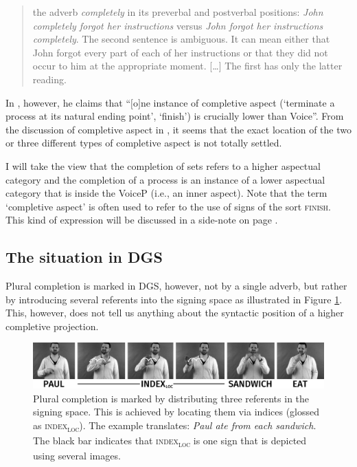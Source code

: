 \begin{quote}
the adverb \textit{completely} in its preverbal and postverbal positions: \textit{John completely forgot her instructions} versus \textit{John forgot her instructions completely}. The second sentence is ambiguous. It can mean either that John forgot every part of each of her instructions or that they did not occur to him at the appropriate moment. [\dots ] The first has only the latter reading.
\end{quote}


\noindent In \citet[69]{cinque2006restructuring}, however, he claims that ``$[$o$]$ne instance of completive aspect (`terminate a process at its natural ending point', `finish') is crucially lower than Voice''. From the discussion of completive aspect in \citet{cinque2006restructuring}, it seems that the exact location of the two or three different types of completive aspect is not totally settled. 

I will take the view that the completion of sets refers to a higher aspectual category and the completion of a process is an instance of a lower aspectual category that is inside the VoiceP (i.e., an inner aspect). Note that the term `completive aspect' is often used to refer to the use of signs of the sort \textsc{finish}. This kind of expression will be discussed in a side-note on page \pageref{exkursfertigdurch}.

\subsection{The situation in DGS}
Plural completion is marked in DGS, however, not by a single adverb, but rather by introducing several referents into the signing space as illustrated in Figure \ref{fig:completiveonedgs}. This, however, does not tell us anything about the syntactic position of a higher completive projection. 


\begin{figure}[bt]
\centering
	\includegraphics[width=1.0\textwidth]{completivesw.jpg}
	\caption{Plural completion is marked by distributing three referents in the signing space. This is achieved by locating them via indices (glossed as \textsc{index}\textsubscript{\textsc{loc}}). The example translates: \textit{Paul ate from each sandwich}. The black bar indicates that \textsc{index\textsubscript{loc}} is one sign that is depicted using several images.}
	\label{fig:completiveonedgs}
\end{figure}


